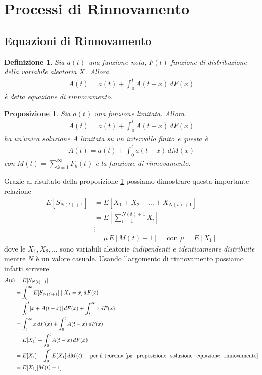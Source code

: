 \documentclass{article}
\newtheorem{definizione}{Definizione}[section]
\newtheorem{proposizione}{Proposizione}[section]
\begin{document}
\newpage
\section{Processi di Rinnovamento}


\subsection{Equazioni di Rinnovamento}

\begin{definizione}
Sia $a(t)$ una funzione nota, $F(t)$ funzione di distribuzione della variabile aleatoria $X$. Allora
\begin{align*}
A(t) = a(t)+\int_0^tA(t-x)\,dF(x)
\end{align*}
è detta \emph{equazione di rinnovamento}.
\end{definizione}

\begin{proposizione}
\label{pr_proposizione_soluzione_equazione_rinnovamento}
Sia $a(t)$ una funzione limitata. Allora
\begin{align*}
A(t) = a(t)+\int_0^tA(t-x)\,dF(x)
\end{align*}
ha un'unica soluzione $A$ limitata su un intervallo finito e questa è
\begin{align*}
A(t) = a(t)+\int_0^ta(t-x)\,dM(x)
\end{align*}
con $M(t) = \sum_{k=1}^{\infty} F_k(t)$ è la funzione di rinnovamento.
\end{proposizione}

Grazie al risultato della proposizione \ref{pr_proposizione_soluzione_equazione_rinnovamento} possiamo dimostrare questa importante relazione
\begin{align*}
E[S_{N(t) + 1}] &= E[X_1 + X_2 + \hdots + X_{N(t) + 1}]\\
&= E[\sum_{i = 1}^{N(t) + 1} X_i]\\
&\vdots\\
&= \mu\,E[M(t) + 1]\quad \text{ con } \mu = E[X_1]
\end{align*}
dove le $X_1,X_2,\hdots$ sono variabili aleatorie \emph{indipendenti e identicamente distribuite} mentre $N$ è un valore casuale.
Usando l'argomento di rinnovamento possiamo infatti scrivere
\begin{align*}
A(t) &= E[S_{N(t) + 1}]\\
&=\int_0^{\infty}E[S_{N(t)+1}] \mid X_1 = x]\,dF(x)\\
&=\int_0^t [x + A(t-x)]\,dF(x) + \int_t^{\infty}x\,dF(x)\\
&=\int_t^{\infty}x\,dF(x)+\int_0^tA(t-x)\,dF(x)\\
&=E[X_1]+\int_0^tA(t-x)\,dF(x)\\
&=E[X_1]+\int_0^tE[X_1]\,dM(t) \quad \text{ per il teorema \ref{pr_proposizione_soluzione_equazione_rinnovamento}}\\
&=E[X_1][M(t) + 1]
\end{align*}
\end{document}
